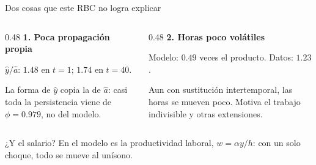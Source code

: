 \begin{frame}[label=limites]{Dos cosas que este RBC no logra explicar}
  \begin{columns}[T,onlytextwidth]
    \begin{column}{0.48\textwidth}
      \textbf{1. Poca propagación propia}\par
      \vspace{0.2cm}
      $\hat y/\hat a$: $1.48$ en $t=1$; $1.74$ en $t=40$.\par
      \vspace{0.2cm}
      La forma de $\hat y$ copia la de $\hat a$: casi toda la persistencia viene de
      $\phi=0.979$, no del modelo.
    \end{column}
    \begin{column}{0.48\textwidth}
      \textbf{2. Horas poco volátiles}\par
      \vspace{0.2cm}
      Modelo: $0.49$ veces el producto. Datos: $1.23$.\par
      \vspace{0.2cm}
      Aun con sustitución intertemporal, las horas se mueven poco. Motiva el trabajo
      indivisible y otras extensiones.
    \end{column}
  \end{columns}
  \par\vspace{0.5cm}
  ¿Y el salario? En el modelo es la productividad laboral, $w=\alpha y/h$: con un solo
  choque, todo se mueve al unísono.
\end{frame}

